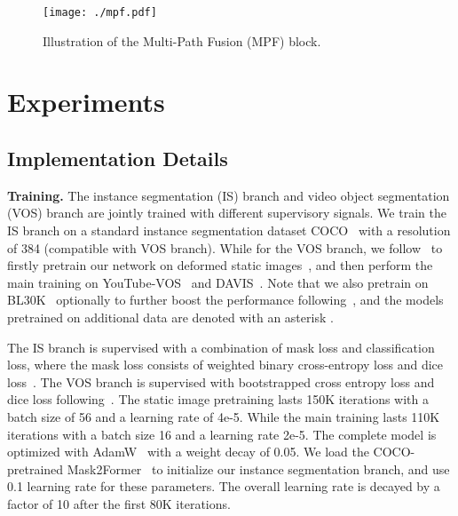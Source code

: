 \documentclass[10pt,twocolumn,letterpaper]{article}
\begin{document}
\begin{figure}[t]
  \centering
  \texttt{[image: ./mpf.pdf]}
   \vspace{-0.25in}
   \caption{Illustration of the Multi-Path Fusion (MPF) block.}
   \label{fig:vos_decoder}
\end{figure}

\section{Experiments}
\label{sec:exp}
\subsection{Implementation Details}
\label{subsec:implementation}
\noindent \textbf{Training.} The instance segmentation (IS) branch and video object segmentation (VOS) branch are jointly trained with different supervisory signals. We train the IS branch on a standard instance segmentation dataset COCO~\cite{lin2014microsoft} with a resolution of 384 (compatible with VOS branch). While for the VOS branch, we follow~\cite{oh2019video,seong2020kernelized,liang2020video,cheng2021stcn,cheng2022xmem} to firstly pretrain our network on deformed static images~\cite{cheng2020cascadepsp,li2020fss,shi2015hierarchical,wang2017learning,zeng2019towards}, and then perform the main training on YouTube-VOS~\cite{xu2018YouTube}
and DAVIS~\cite{pont20172017}. Note that we also pretrain on BL30K~\cite{chang2015shapenet,denninger2019blenderproc,cheng2021mivos} optionally to further boost the performance following~\cite{cheng2021stcn,cheng2022xmem}, and the models pretrained on additional data are denoted with an asterisk .  

The IS branch is supervised with a combination of mask loss and classification loss, where the mask loss consists of weighted binary cross-entropy loss and dice loss~\cite{milletari2016v}. The VOS branch is supervised with bootstrapped cross entropy loss and dice loss following~\cite{yang2021associating}. The static image pretraining lasts 150K iterations with a batch size of 56 and a learning rate of 4e-5. While the main training lasts 110K iterations with a batch size 16 and a learning rate 2e-5. The complete model is optimized with AdamW~\cite{kingma2014adam,loshchilov2017decoupled} with a weight decay of 0.05.  We load the COCO-pretrained Mask2Former~\cite{cheng2022masked} to initialize our instance segmentation branch, and use 0.1 learning rate for these parameters. The overall learning rate is decayed by a factor of 10 after the first 80K iterations.
\end{document}
